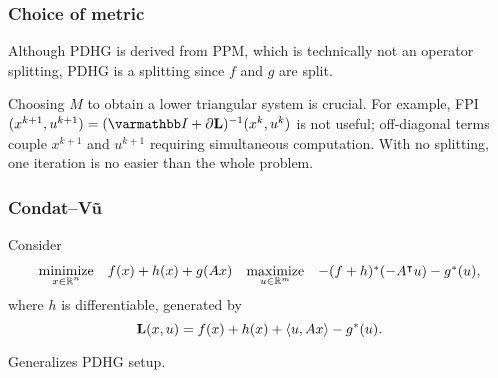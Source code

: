 \documentclass[10pt,mathserif]{beamer}
\begin{document}
\begin{frame}
\frametitle{Choice of metric}
Although PDHG is derived from PPM, which is technically not an operator splitting, PDHG is a splitting since $f$ and $g$ are split.


\vspace{0.2in}
Choosing $M$ to obtain a lower triangular system is crucial.
For example, FPI $(x^{k+1}, u ^{k+1})=(\opI+\partial \lagrange)^{-1}(x^{k}, u ^{k})$ is not useful;
off-diagonal terms couple $x^{k+1}$ and $ u ^{k+1}$ requiring simultaneous computation.
With no splitting,  one iteration is no easier than the whole problem.
\end{frame}

\begin{frame}
\frametitle{Condat--V\~u}
Consider
\[
\begin{array}{ll}
\underset{\substack{x\in \mathbb{R}^n}}{\mbox{minimize}}&f(x)+h(x)+g(Ax)
\end{array}
\begin{array}{ll}
\underset{ u  \in \mathbb{R}^m}{\mbox{maximize}}&-(f+h)^*(-A^\intercal u )-g^*( u ),
\end{array}
\]
where $h$ is differentiable,
generated by
\[
\mathbf{L}(x, u )=f(x)+h(x)+\langle  u , Ax\rangle-g^*( u ).
\]

\vspace{0.2in}
Generalizes PDHG setup.
\end{frame}
\end{document}
